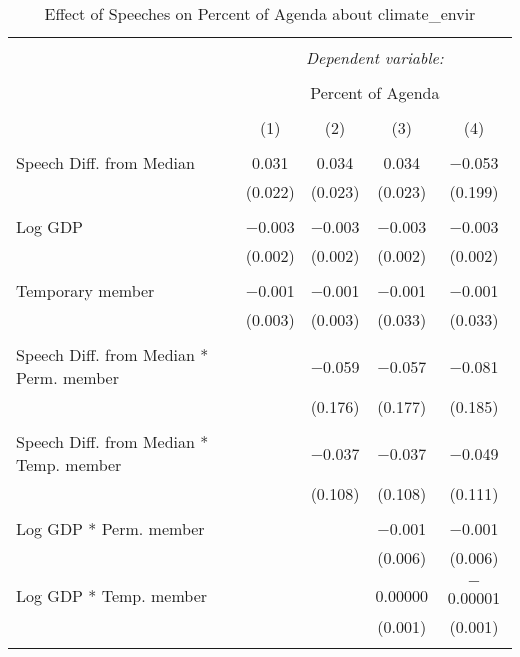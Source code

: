 
\begin{table}[!htbp] \centering 
  \caption{Effect of Speeches on Percent of Agenda about climate_envir} 
  \label{} 
\begin{tabular}{@{\extracolsep{5pt}}lcccc} 
\\[-1.8ex]\hline 
\hline \\[-1.8ex] 
 & \multicolumn{4}{c}{\textit{Dependent variable:}} \\ 
\cline{2-5} 
\\[-1.8ex] & \multicolumn{4}{c}{Percent of Agenda} \\ 
\\[-1.8ex] & (1) & (2) & (3) & (4)\\ 
\hline \\[-1.8ex] 
 Speech Diff. from Median & 0.031 & 0.034 & 0.034 & $-$0.053 \\ 
  & (0.022) & (0.023) & (0.023) & (0.199) \\ 
  & & & & \\ 
 Log GDP & $-$0.003 & $-$0.003 & $-$0.003 & $-$0.003 \\ 
  & (0.002) & (0.002) & (0.002) & (0.002) \\ 
  & & & & \\ 
 Temporary member & $-$0.001 & $-$0.001 & $-$0.001 & $-$0.001 \\ 
  & (0.003) & (0.003) & (0.033) & (0.033) \\ 
  & & & & \\ 
 Speech Diff. from Median * Perm. member &  & $-$0.059 & $-$0.057 & $-$0.081 \\ 
  &  & (0.176) & (0.177) & (0.185) \\ 
  & & & & \\ 
 Speech Diff. from Median * Temp. member &  & $-$0.037 & $-$0.037 & $-$0.049 \\ 
  &  & (0.108) & (0.108) & (0.111) \\ 
  & & & & \\ 
 Log GDP * Perm. member &  &  & $-$0.001 & $-$0.001 \\ 
  &  &  & (0.006) & (0.006) \\ 
  & & & & \\ 
 Log GDP * Temp. member &  &  & 0.00000 & $-$0.00001 \\ 
  &  &  & (0.001) & (0.001) \\ 
  & & & & \\ 

\end{tabular}
\end{table}

